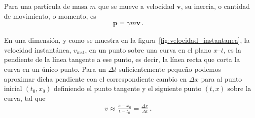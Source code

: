 \documentclass[11pt,a4paper]{book}
\begin{document}
Para una partícula de masa $m$ que se mueve a velocidad $\boldsymbol{v}$, su inercia, o cantidad de movimiento, o momento, es
\begin{align}
    \boldsymbol{p} = \gamma m \boldsymbol{v}\,.
\end{align}


En una dimensión, y como se muestra en la figura~\ref{fig:velocidad_instantanea}, la velocidad instantánea, $v_{\text{inst}}$, en un punto sobre una curva en el plano $x$--$t$, es la pendiente de la línea tangente a ese punto, es decir, la línea recta que corta la curva en un único punto. Para un $\Delta t$ suficientemente pequeño podemos aproximar dicha pendiente con el correspondiente cambio en $\Delta x$ para al punto inicial $(t_0,x_0)$ definiendo el punto tangente y el siguiente punto $(t,x)$ sobre la curva, tal que
\begin{align}
    v \approx \frac{x-x_0}{t-t_0}= \frac{\Delta x}{\Delta t}\,.
\end{align}




\end{document}
